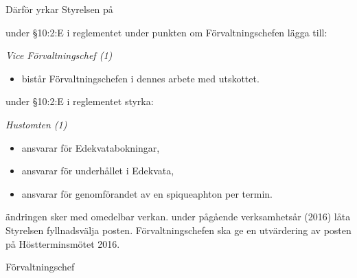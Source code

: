 \documentclass[../_main/handlingar.tex]{subfiles}
\begin{document}

Därför yrkar Styrelsen på
\begin{attsatser}
    \att under \S10:2:E i reglementet under punkten om Förvaltningschefen lägga till:\par
    {\it
    Vice Förvaltningschef (1)
    \begin{itemize}[label={--}, topsep=0cm, noitemsep]
        \item bistår Förvaltningschefen i dennes arbete med utskottet.
    \end{itemize}
    }
    \att under \S10:2:E i reglementet styrka:\par
    {\it
    Hustomten (1)
    \begin{itemize}[label={--}, topsep=0cm, noitemsep]
        \item ansvarar för Edekvatabokningar,
        \item ansvarar för underhållet i Edekvata,
        \item ansvarar för genomförandet av en spiqueaphton per termin.
    \end{itemize}
    }
    \att ändringen sker med omedelbar verkan.
    \att under pågående verksamhetsår (2016) låta Styrelsen fyllnadsvälja posten.
    \att Förvaltningschefen ska ge en utvärdering av posten på Höstterminsmötet 2016.
\end{attsatser}

\begin{signatures}{1}
    \ist
    \signature{Anders Nilsson}{Förvaltningschef}
\end{signatures}
\end{document}
